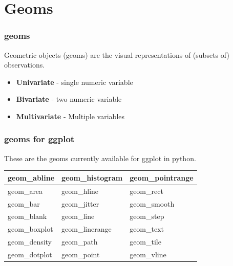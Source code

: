 \documentclass{beamer}
\begin{document}
\section{Geoms}
\begin{frame}
	\frametitle{geoms}
	\Large
	Geometric objects (geoms) are the visual representations of (subsets of) observations.
	\begin{itemize}
		\item \textbf{Univariate} - single numeric variable
		\item \textbf{Bivariate} - two numeric variable
		\item \textbf{Multivariate} - Multiple variables
	\end{itemize}
\end{frame}
\begin{frame}
\frametitle{geoms for ggplot}
	\Large
These are the geoms currently available for ggplot in python. \\

\bigskip
	\begin{tabular}{|l|l|l	|}
		\hline
geom\_abline	&	geom\_histogram	&	geom\_pointrange	\\ \hline
geom\_area	&	geom\_hline	&	geom\_rect	\\ \hline
geom\_bar	&	geom\_jitter	&	geom\_smooth	\\ \hline
geom\_blank	&	geom\_line	&	geom\_step	\\ \hline
geom\_boxplot	&	geom\_linerange	&	geom\_text	\\ \hline
geom\_density	&	geom\_path	&	geom\_tile	\\ \hline
geom\_dotplot	&	geom\_point	&	geom\_vline	\\ \hline


	\end{tabular} 
\end{frame}
\end{document}
